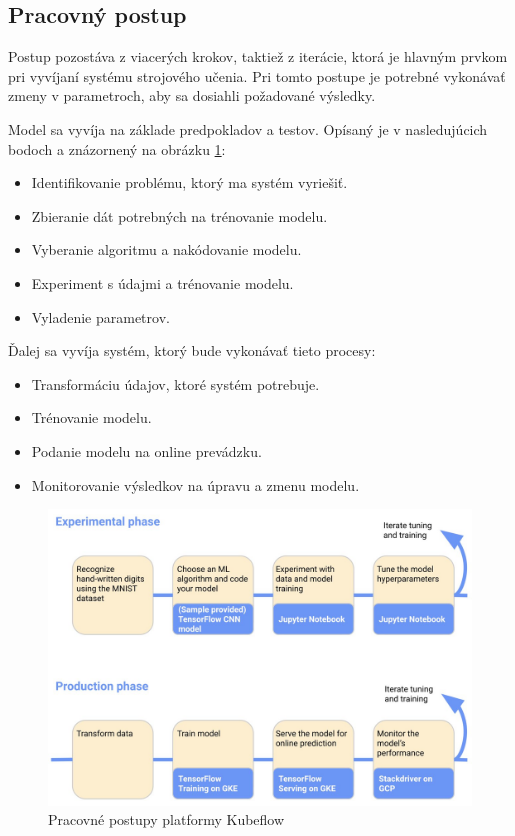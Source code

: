 \subsection{Pracovný postup}

Postup pozostáva z viacerých krokov, taktiež z iterácie, ktorá je hlavným prvkom pri vyvíjaní systému strojového učenia. Pri tomto postupe je potrebné vykonávať zmeny v parametroch, aby sa dosiahli požadované výsledky.

Model sa vyvíja na základe predpokladov a testov. Opísaný je v nasledujúcich bodoch a znázornený na obrázku \ref{postup}: \cite{work}

\begin{itemize}
    \item Identifikovanie problému, ktorý ma systém vyriešiť.
    \item Zbieranie dát potrebných na trénovanie modelu.
    \item Vyberanie algoritmu a nakódovanie modelu.
    \item Experiment s údajmi a trénovanie modelu.
	\item Vyladenie parametrov.
\end{itemize}

Ďalej sa vyvíja systém, ktorý bude vykonávať tieto procesy:

\begin{itemize}
    \item Transformáciu údajov, ktoré systém potrebuje.
	\item Trénovanie modelu.
	\item Podanie modelu na online prevádzku.
	\item Monitorovanie výsledkov na úpravu a zmenu modelu.
\end{itemize}

\begin{figure}[!h]
    \centering
    \includegraphics[width=1\linewidth]{figures/kubeflowwork}
    \caption{Pracovné postupy platformy Kubeflow \cite{work}}
    \label{postup}
\end{figure}


